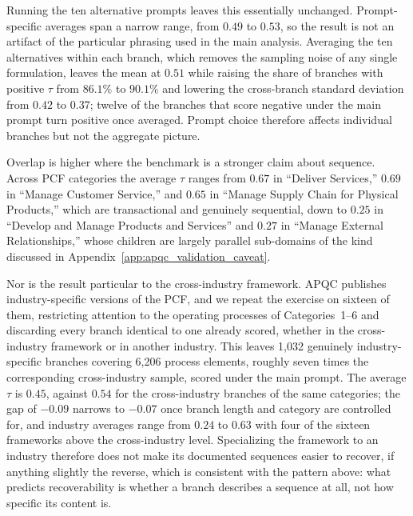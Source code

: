 Running the ten alternative prompts leaves this essentially unchanged.
Prompt-specific averages span a narrow range, from $0.49$ to $0.53$, so the result is not an artifact of the particular phrasing used in the main analysis.
Averaging the ten alternatives within each branch, which removes the sampling noise of any single formulation, leaves the mean at $0.51$ while raising the share of branches with positive $\tau$ from $86.1\%$ to $90.1\%$ and lowering the cross-branch standard deviation from $0.42$ to $0.37$; twelve of the branches that score negative under the main prompt turn positive once averaged.
Prompt choice therefore affects individual branches but not the aggregate picture.

Overlap is higher where the benchmark is a stronger claim about sequence.
Across PCF categories the average $\tau$ ranges from $0.67$ in ``Deliver Services,'' $0.69$ in ``Manage Customer Service,'' and $0.65$ in ``Manage Supply Chain for Physical Products,'' which are transactional and genuinely sequential, down to $0.25$ in ``Develop and Manage Products and Services'' and $0.27$ in ``Manage External Relationships,'' whose children are largely parallel sub-domains of the kind discussed in Appendix~\ref{app:apqc_validation_caveat}.

Nor is the result particular to the cross-industry framework.
APQC publishes industry-specific versions of the PCF, and we repeat the exercise on sixteen of them, restricting attention to the operating processes of Categories~1--6 and discarding every branch identical to one already scored, whether in the cross-industry framework or in another industry.
This leaves 1,032 genuinely industry-specific branches covering 6,206 process elements, roughly seven times the corresponding cross-industry sample, scored under the main prompt.
The average $\tau$ is $0.45$, against $0.54$ for the cross-industry branches of the same categories; the gap of $-0.09$ narrows to $-0.07$ once branch length and category are controlled for, and industry averages range from $0.24$ to $0.63$ with four of the sixteen frameworks above the cross-industry level.
Specializing the framework to an industry therefore does not make its documented sequences easier to recover, if anything slightly the reverse, which is consistent with the pattern above: what predicts recoverability is whether a branch describes a sequence at all, not how specific its content is.

